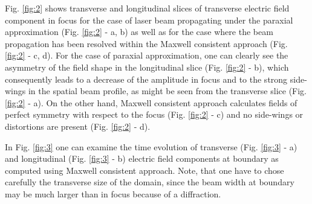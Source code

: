 Fig. \ref{fig:2} shows transverse and longitudinal slices of transverse electric field component in focus for the case of laser beam propagating under the paraxial approximation (Fig. \ref{fig:2} - a, b) as well as for the case where the beam propagation has been resolved within the Maxwell consistent approach (Fig. \ref{fig:2} - c, d). For the case of paraxial approximation, one can clearly see the asymmetry of the field shape in the longitudinal slice (Fig. \ref{fig:2} - b), which consequently leads to a decrease of the amplitude in focus and to the strong side-wings in the spatial beam profile, as might be seen from the transverse slice (Fig. \ref{fig:2} - a). On the other hand, Maxwell consistent approach calculates fields of perfect symmetry with respect to the focus (Fig. \ref{fig:2} - c) and no side-wings or distortions are present (Fig. \ref{fig:2} - d).

In Fig. \ref{fig:3} one can examine the time evolution of transverse (Fig. \ref{fig:3} - a) and longitudinal (Fig. \ref{fig:3} - b) electric field components at boundary as computed using Maxwell consistent approach. Note, that one have to chose carefully the transverse size of the domain, since the beam width at boundary may be much larger than in focus because of a diffraction.


